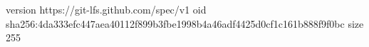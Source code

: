 version https://git-lfs.github.com/spec/v1
oid sha256:4da333efc447aea40112f899b3fbe1998b4a46adf4425d0cf1c161b888f9f0bc
size 255
